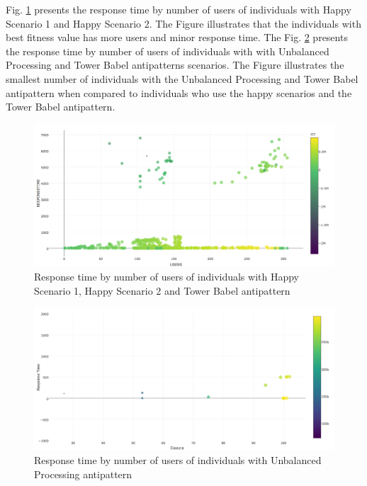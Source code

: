 Fig. \ref{fig:responsetimegenerationalltests2} presents the response time by number of users of individuals with Happy Scenario 1 and Happy Scenario 2. The Figure illustrates that the individuals with best fitness value has more users and minor response time. The Fig. \ref{fig:fitnessgenerationalltests2-1} presents the response time by number of users of individuals with with Unbalanced Processing and Tower Babel antipatterns scenarios. The Figure illustrates the smallest number of individuals with the  Unbalanced Processing and Tower Babel antipattern when compared to individuals who use the happy scenarios and the Tower Babel antipattern.



\begin{figure}[h]
\centering
\includegraphics[width=1\textwidth]{./images/experiment2-5.png}
\caption{Response time by number of users of individuals with Happy Scenario 1, Happy Scenario 2 and Tower Babel antipattern}
\label{fig:responsetimegenerationalltests2}
\end{figure}


\begin{figure}[h]
\centering
\includegraphics[width=1\textwidth]{./images/experiment2-6.png}
\caption{Response time by number of users of individuals with Unbalanced Processing antipattern}
\label{fig:fitnessgenerationalltests2-1}
\end{figure}


